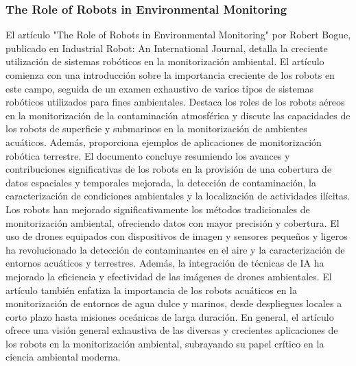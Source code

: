 \subsubsection{The Role of Robots in Environmental Monitoring} %
\label{ssub:EN}
    El art\'iculo "The Role of Robots in Environmental Monitoring" por Robert Bogue, publicado en Industrial Robot:
        An International Journal, detalla la creciente utilizaci\'on de sistemas rob\'oticos en la monitorizaci\'on ambiental. 
        El art\'iculo comienza con una introducci\'on sobre la importancia creciente de los robots en este campo, seguida de 
        un examen exhaustivo de varios tipos de sistemas rob\'oticos utilizados para fines ambientales. Destaca los roles 
        de los robots a\'ereos en la monitorizaci\'on de la contaminaci\'on atmosf\'erica y discute las capacidades de los 
        robots de superficie y submarinos en la monitorizaci\'on de ambientes acu\'aticos. Adem\'as, proporciona ejemplos 
        de aplicaciones de monitorizaci\'on rob\'otica terrestre. El documento concluye resumiendo los avances y 
        contribuciones significativas de los robots en la provisi\'on de una cobertura de datos espaciales y 
        temporales mejorada, la detecci\'on de contaminaci\'on, la caracterizaci\'on de condiciones ambientales y 
        la localizaci\'on de actividades il\'icitas.
    \vskip 0.5cm
    Los robots han mejorado significativamente los m\'etodos tradicionales de monitorizaci\'on ambiental, 
        ofreciendo datos con mayor precisi\'on y cobertura. El uso de drones equipados con dispositivos 
        de imagen y sensores peque\~nos y ligeros ha revolucionado la detecci\'on de contaminantes en el 
        aire y la caracterizaci\'on de entornos acu\'aticos y terrestres. Adem\'as, la integraci\'on de t\'ecnicas 
        de IA ha mejorado la eficiencia y efectividad de las im\'agenes de drones ambientales. El art\'iculo 
        tambi\'en enfatiza la importancia de los robots acu\'aticos en la monitorizaci\'on de entornos de agua 
        dulce y marinos, desde despliegues locales a corto plazo hasta misiones oce\'anicas de larga duraci\'on.
        En general, el art\'iculo ofrece una visi\'on general exhaustiva de las diversas y crecientes aplicaciones 
        de los robots en la monitorizaci\'on ambiental, subrayando su papel cr\'itico en la ciencia ambiental moderna. \cite{Bogue2023}
